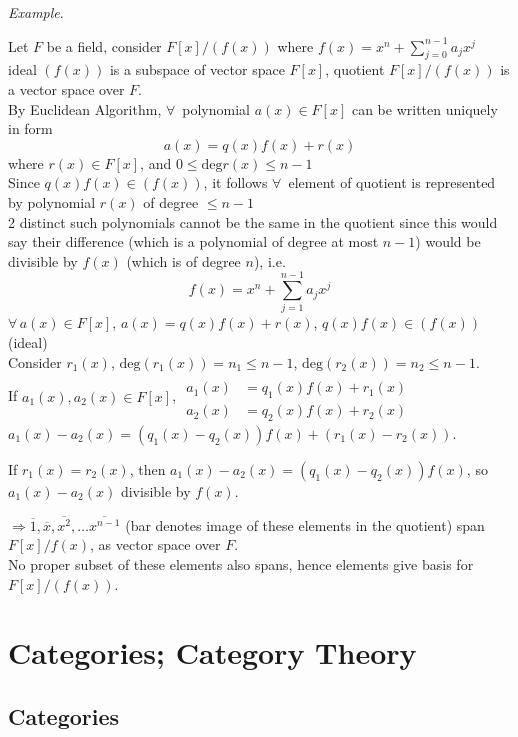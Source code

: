 \emph{Example}. 

Let $F$ be a field, consider $F[x]/(f(x))$ where $f(x) = x^n + \sum_{j=0}^{n-1} a_j x^j$ \\
ideal $(f(x))$ is a subspace of vector space $F[x]$, quotient $F[x]/(f(x))$ is a vector space over $F$. \\

By Euclidean Algorithm, $\forall \, $ polynomial $a(x) \in F[x]$ can be written uniquely in form
\[
a(x) = q(x) f(x) + r(x)
\]
where $r(x) \in F[x]$, and $0\leq \text{deg}{r(x)} \leq n -1$ \\
Since $q(x) f(x) \in (f(x))$, it follows $\forall\, $ element of quotient is represented by polynomial $r(x)$ of degree $\leq n - 1$ \\
2 distinct such polynomials cannot be the same in the quotient since this would say their difference (which is a polynomial of degree at most $n-1$) would be divisible by $f(x)$ (which is of degree $n$), i.e. 
\[
f(x) = x^n + \sum_{j=1}^{n-1} a_j x^j
\]
$\forall \, a(x) \in F[x]$, $a(x) = q(x) f(x) + r(x)$, $q(x) f(x) \in (f(x))$ (ideal) \\

Consider $r_1(x)$, $\text{deg}(r_1(x)) = n_1 \leq n -1$, $\text{deg}(r_2(x)) = n_2 \leq n -1$. \\
If $a_1(x), a_2(x) \in F[x]$, $\begin{aligned} 
& \quad \\ 
a_1(x) & = q_1(x) f(x) + r_1(x) \\ 
a_2(x) & = q_2(x) f(x) + r_2(x) \end{aligned}$  $a_1(x) - a_2(x) = (q_1(x) - q_2(x)) f(x) + (r_1(x) - r_2(x))$.

If $r_1(x) = r_2(x)$, then $a_1(x) - a_2(x) = (q_1(x) - q_2(x)) f(x)$, so $a_1(x) - a_2(x)$ divisible by $f(x)$.

$\Longrightarrow \overline{1}, \overline{x}, \overline{x^2} , \dots \overline{x^{n-1}}$ (bar denotes image of these elements in the quotient) span $F[x]/f(x)$, as vector space over $F$. \\
No proper subset of these elements also spans, hence elements give basis for $F[x]/(f(x))$.





\section{Categories; Category Theory}  

\subsection{Categories}

